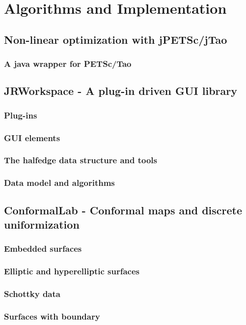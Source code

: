 \chapter{Algorithms and Implementation}

\section{Non-linear optimization with jPETSc/jTao}
\subsection{A java wrapper for PETSc/Tao}

\section{JRWorkspace - A plug-in driven GUI library}
\subsection{Plug-ins}
\subsection{GUI elements}
\subsection{The halfedge data structure and tools}
\subsection{Data model and algorithms}

\section{ConformalLab - Conformal maps and discrete uniformization}
\subsection{Embedded surfaces}
\subsection{Elliptic and hyperelliptic surfaces}
\subsection{Schottky data}
\subsection{Surfaces with boundary}

